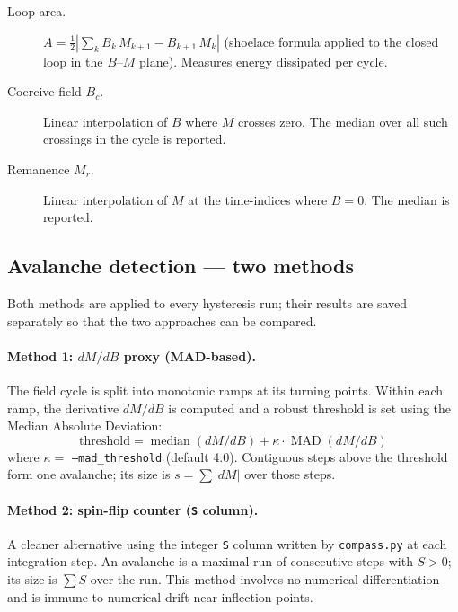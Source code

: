 \documentclass[11pt,a4paper]{article}
\newcommand{\param}[1]{\texttt{--#1}}
\begin{document}
\begin{description}
  \item[Loop area.]  $\displaystyle A = \tfrac{1}{2}\left|\sum_{k} B_k\,M_{k+1} - B_{k+1}\,M_k\right|$
    (shoelace formula applied to the closed loop in the $B$--$M$ plane).
    Measures energy dissipated per cycle.

  \item[Coercive field $B_c$.]  Linear interpolation of $B$ where $M$ crosses
    zero.  The median over all such crossings in the cycle is reported.

  \item[Remanence $M_r$.]  Linear interpolation of $M$ at the time-indices
    where $B = 0$.  The median is reported.
\end{description}

\subsection{Avalanche detection --- two methods}

Both methods are applied to every hysteresis run; their results are saved
separately so that the two approaches can be compared.

\paragraph{Method 1: $dM/dB$ proxy (MAD-based).}
The field cycle is split into monotonic ramps at its turning points.  Within
each ramp, the derivative $dM/dB$ is computed and a robust threshold is set
using the Median Absolute Deviation:
\begin{equation}
  \text{threshold} = \operatorname{median}(dM/dB) + \kappa \cdot \operatorname{MAD}(dM/dB)
\end{equation}
where $\kappa = $ \param{mad\_threshold} (default 4.0).  Contiguous steps above
the threshold form one avalanche; its size is $s = \sum |dM|$ over those steps.

\paragraph{Method 2: spin-flip counter (\texttt{S} column).}
A cleaner alternative using the integer \texttt{S} column written by
\texttt{compass.py} at each integration step.  An avalanche is a maximal run
of consecutive steps with $S > 0$; its size is $\sum S$ over the run.
This method involves no numerical differentiation and is immune to numerical
drift near inflection points.
\end{document}
